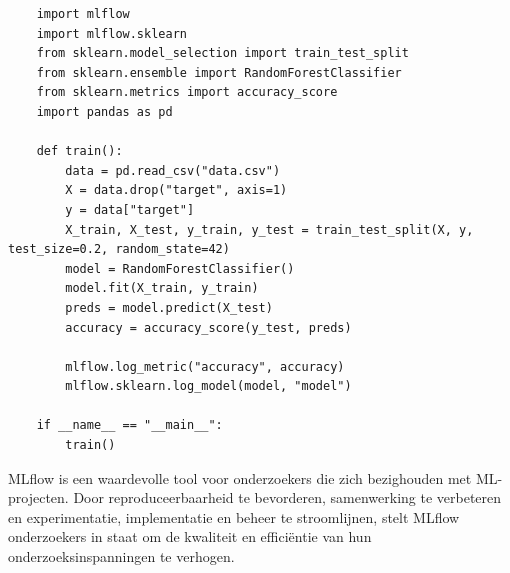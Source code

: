 \begin{verbatim}
    import mlflow
    import mlflow.sklearn
    from sklearn.model_selection import train_test_split
    from sklearn.ensemble import RandomForestClassifier
    from sklearn.metrics import accuracy_score
    import pandas as pd
    
    def train():
        data = pd.read_csv("data.csv")
        X = data.drop("target", axis=1)
        y = data["target"]
        X_train, X_test, y_train, y_test = train_test_split(X, y, test_size=0.2, random_state=42)
        model = RandomForestClassifier()
        model.fit(X_train, y_train)
        preds = model.predict(X_test)
        accuracy = accuracy_score(y_test, preds)
        
        mlflow.log_metric("accuracy", accuracy)
        mlflow.sklearn.log_model(model, "model")
    
    if __name__ == "__main__":
        train()
\end{verbatim}
MLflow is een waardevolle tool voor onderzoekers die zich bezighouden met ML-projecten. Door reproduceerbaarheid te bevorderen, samenwerking te verbeteren en experimentatie, implementatie en beheer te stroomlijnen, stelt MLflow onderzoekers in staat om de kwaliteit en efficiëntie van hun onderzoeksinspanningen te verhogen.
